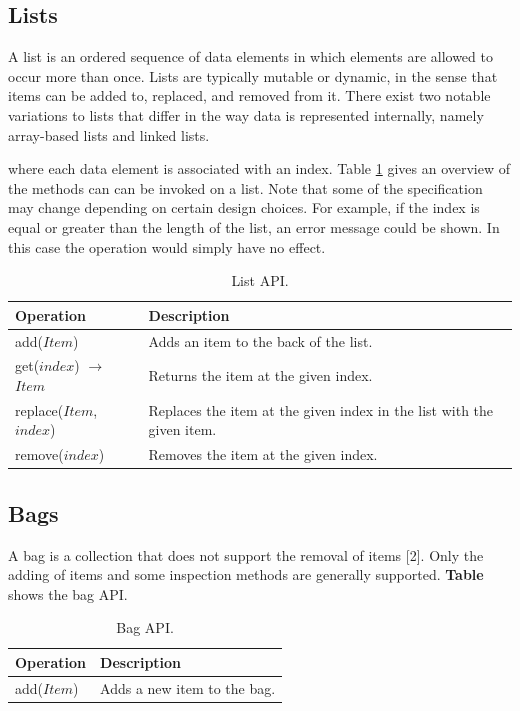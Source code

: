 \subsection{Lists}

A list is an ordered sequence of data elements in which elements are allowed to occur more than once. Lists are typically mutable or dynamic, in the sense that items can be added to, replaced, and removed from it. There exist two notable variations to lists that differ in the way data is represented internally, namely array-based lists and linked lists.

where each data element is associated with an index. Table \ref{tab:api:list} gives an overview of the methods can can be invoked on a list. Note that some of the specification may change depending on certain design choices. For example, if the index is equal or greater than the length of the list, an error message could be shown. In this case the operation would simply have no effect.

\begin{table}[H]
	\caption{List API.}
	\label{tab:api:list}
	\begin{tabular}{p{150px} | p{250px}}
		\textbf{Operation} & \textbf{Description} \\
		\hline
		add($Item$) & Adds an item to the back of the list. \\
		get($index$) $\rightarrow$ $Item$ & Returns the item at the given index. \\
		replace($Item$, $index$) & Replaces the item at the given index in the list with the given item.  \\
		remove($index$) & Removes the item at the given index. \\
		\hline
	\end{tabular}
\end{table}



\subsection{Bags}

A bag is a collection that does not support the removal of items [2]. Only the adding of items and some inspection methods are generally supported. \textbf{Table} shows the bag API.

\begin{table}[H]
	\caption{Bag API.}
	\label{tab:api:bag}
	\begin{tabular}{p{150px} | p{250px}}
		\textbf{Operation} & \textbf{Description} \\
		\hline
		add($Item$) & Adds a new item to the bag. \\
		\hline
	\end{tabular}
\end{table}



